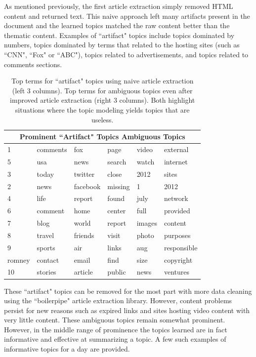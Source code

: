 \documentclass[10pt]{article}
\begin{document}
As mentioned previously, the first article extraction simply removed HTML content and returned text.  This naive approach left many artifacts present in the document and the learned topics matched the raw content better than the thematic content.  Examples of ``artifact" topics include topics dominated by numbers, topics dominated by terms that related to the hosting sites (such as ``CNN", ``Fox" or ``ABC"), topics related to advertisements, and topics related to comments sections.  

\begin{table}
\begin{center}
\begin{tabular}{|l|l|l|l|l|l|}
  \hline
  \multicolumn{6}{|c|}{Prominent ``Artifact" Topics \quad\quad\quad\quad\quad\quad Ambiguous Topics} \\
  \hline
1 & comments & fox & page & video & external \\
5 & usa & news & search & watch & internet\\
3 & today & twitter & close & 2012 & sites\\
2 & news & facebook & missing & 1 & 2012 \\
4 & life & report & found & july & network \\
6  & comment & home & center & full & provided \\
7 & blog & world & report & images & content \\
8 & travel & friends & visit & photo & purposes\\
9 & sports & air & links & aug & responsible\\
romney & contact & email & find & size & copyright \\
10 &  stories & article & public & news & ventures \\
\hline
\end{tabular}
\caption*{Top terms for ``artifact" topics using naive article extraction (left 3 columns). Top terms for ambiguous topics even after improved article extraction (right 3 columns).  Both highlight situations where the topic modeling yields topics that are useless.}
\end{center}
\end{table}

These ``artifact" topics can be removed for the most part with more data cleaning using the ``boilerpipe" article extraction library.  However, content problems persist for new reasons such as expired links and sites hosting video content with very little content.  These ambiguous topics remain somewhat prominent.  However, in the middle range of prominence the topics learned are in fact informative and effective at summarizing a topic.  A few such examples of informative topics for a day are provided.
\end{document}
